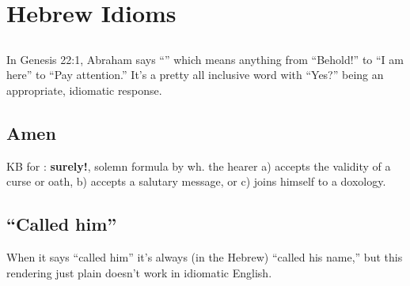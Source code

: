 \section{Hebrew Idioms}\label{app:idioms}\thispagestyle{fancy}
\subsection{}
In Genesis 22:1, Abraham says ``'' which means anything from ``Behold!'' to ``I am here'' to ``Pay attention.'' It's a pretty all inclusive word with ``Yes?'' being an appropriate, idiomatic response.

\subsection{Amen}
KB for : \textbf{surely!}, solemn formula by wh\@. the hearer a) accepts the validity of a curse or oath, b) accepts a salutary message, or c) joins himself to a doxology.

\subsection{``Called him''}
When it says ``called him'' it's always (in the Hebrew) ``called his name,'' but this rendering just plain doesn't work in idiomatic English.
